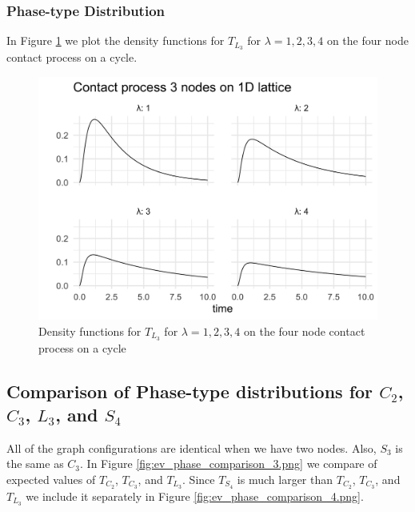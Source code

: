 \documentclass{article}
\theoremstyle{plain}
\theoremstyle{definition}
\theoremstyle{remark}
\numberwithin{equation}{section}
\begin{document}
\subsubsection{Phase-type Distribution}

In Figure \ref{fig:lattice_3_contact_phase_densities} we plot the density functions for $T_{L_3}$ for $\lambda = 1, 2, 3, 4$ on the four node contact process on a cycle.

\begin{figure}[H]
  \centering
    \includegraphics[width=.80\textwidth]{figures/lattice_3_contact_phase_densities.png}
   \caption{Density functions for $T_{L_3}$ for $\lambda = 1, 2, 3, 4$ on the four node contact process on a cycle}
  \label{fig:lattice_3_contact_phase_densities}
\end{figure}

\subsection{Comparison of Phase-type distributions for \texorpdfstring{$C_2$}{C2}, \texorpdfstring{$C_3$}{C3}, \texorpdfstring{$L_3$}{L3}, and \texorpdfstring{$S_4$}{S4}}

All of the graph configurations are identical when we have two nodes.
Also, $S_3$ is the same as $C_3$.
In Figure \ref{fig:ev_phase_comparison_3.png} we compare of expected values of $T_{C_2}$, $T_{C_3}$, and $T_{L_3}$.
Since $T_{S_4}$ is much larger than $T_{C_2}$, $T_{C_3}$, and $T_{L_3}$ we include it separately in Figure \ref{fig:ev_phase_comparison_4.png}.
\end{document}
